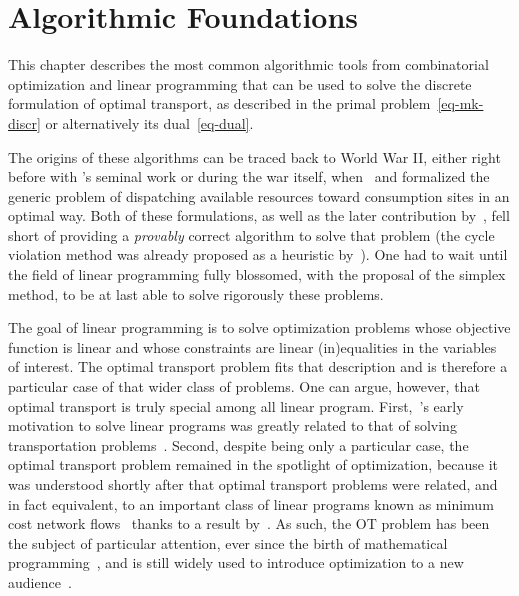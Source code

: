 
\chapter{Algorithmic Foundations}
\label{c-algo-basics} %

This chapter describes the most common algorithmic tools from combinatorial optimization and linear programming that can be used to solve the discrete formulation of optimal transport, as described in the primal problem~\eqref{eq-mk-discr} or alternatively its dual~\eqref{eq-dual}.

The origins of these algorithms can be traced back to World War II, either right before with \citeauthor{tolstoi1930methods}'s seminal work \citeyearpar{tolstoi1930methods} or during the war itself, when~\citet{Hitchcock41} and \citet{Kantorovich42} formalized the generic problem of dispatching available resources toward consumption sites in an optimal way. Both of these formulations, as well as the later contribution by~\citet{koopmans1949optimum}, fell short of providing a \emph{provably} correct algorithm to solve that problem (the cycle violation method was already proposed as a heuristic by~\citet{tolstoi1939metody}). One had to wait until the field of linear programming fully blossomed, with the proposal of the simplex method, to be at last able to solve rigorously these problems.

The goal of linear programming is to solve optimization problems whose objective function is linear and whose constraints are linear (in)equalities in the variables of interest. The optimal transport problem fits that description and is therefore a particular case of that wider class of problems. One can argue, however, that optimal transport is truly special among all linear program. First,~\citeauthor{dantzig1991}'s early motivation to solve linear programs was greatly related to that of solving transportation problems~\citep[p. 210]{dantzig49econometrica}. Second, despite being only a particular case, the optimal transport problem remained in the spotlight of optimization, because it was understood shortly after that optimal transport problems were related, and in fact equivalent, to an important class of linear programs known as minimum cost network flows~\citep[p. 213, Lem. 9.3]{korte2012combinatorial} thanks to a result by~\citet{ford1962flows}. As such, the OT problem has been the subject of particular attention, ever since the birth of mathematical programming~\citep{Dantzig51}, and is still widely used to introduce optimization to a new audience~\citep[\S1, p. 4]{nocedal}. 

